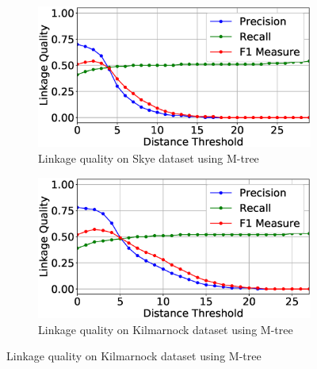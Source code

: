 \documentclass{llncs}
\begin{document}
\begin{figure}
\centering
\begin{subfigure}{.5\textwidth}
  \centering
\includegraphics[width=\textwidth]{figures/plotLQ-skye-mtree}
\caption{Linkage quality on Skye dataset using M-tree\label{skye-quality-mtree}}
\end{subfigure}%
\begin{subfigure}{.5\textwidth}
  \centering
\includegraphics[width=\textwidth]{figures/plotLQ-kilmarnock-mtree}
\caption{Linkage quality on Kilmarnock dataset using M-tree\label{kilmarnock-quality-mtree}}
\end{subfigure}


\end{figure}
\end{document}
